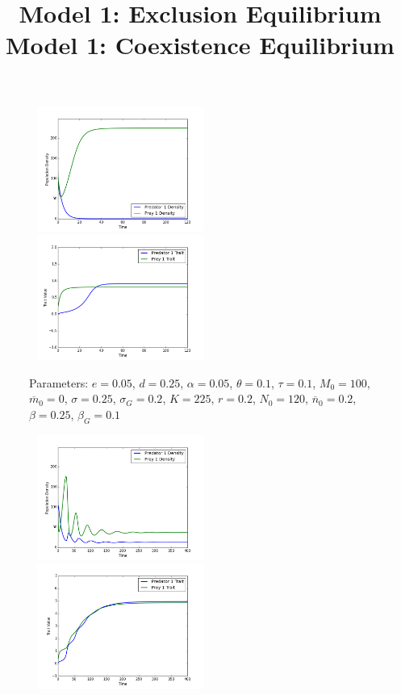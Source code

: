 \documentclass{amsart}
\theoremstyle{definition}
\theoremstyle{remark}
\numberwithin{equation}{section}
\begin{document}
\begin{centering}
	\begin{figure}
		\title{\bf Model 1: Exclusion Equilibrium\\}
		\includegraphics[width=6cm,height=4.1cm]{figures/1x1/constant_growth/densities_exclusion.png}
		\includegraphics[width=6cm,height=4.1cm]{figures/1x1/constant_growth/traits_exclusion.png}
		\caption{\footnotesize Parameters: $e = 0.05$, $d = 0.25$, $\alpha = 0.05$, $\theta = 0.1$, $\tau = 0.1$, $M_0 = 100$, $\overline{m}_0 = 0$, $\sigma = 0.25$, $\sigma_G = 0.2$, $K = 225$, $r = 0.2$, $N_0 = 120$, $\overline{n}_0 = 0.2$, $\beta = 0.25$, $\beta_G = 0.1$}
		\label{fig:constant_growth_exclusion}
	\end{figure}
	\begin{figure}
		\title{\bf Model 1: Coexistence Equilibrium\\}
		\includegraphics[width=6cm,height=4.1cm]{figures/1x1/constant_growth/densities_stable_coexistence.png}
		\includegraphics[width=6cm,height=4.1cm]{figures/1x1/constant_growth/traits_stable_coexistence.png}

\end{figure}
\end{centering}
\end{document}
